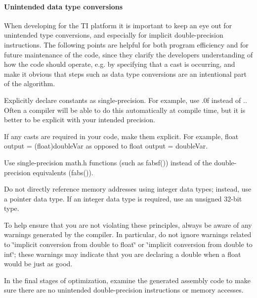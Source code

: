 \hypertarget{a00832_subsubsection__unintended_data_type_conversions_}{}\paragraph{Unintended data type conversions}\label{a00832_subsubsection__unintended_data_type_conversions_}
 When developing for the TI platform it is important to keep an eye out for unintended type conversions, and especially for implicit double-\/precision instructions. The following points are helpful for both program efficiency and for future maintenance of the code, since they clarify the developer\textquotesingle{}s understanding of how the code should operate, e.\+g. by specifying that a cast is occurring, and make it obvious that steps such as data type conversions are an intentional part of the algorithm. 
\begin{DoxyItemize}
\item Explicitly declare constants as single-\/precision. For example, use {.\+0f} instead of {.}. Often a compiler will be able to do this automatically at compile time, but it is better to be explicit with your intended precision.  
\item If any casts are required in your code, make them explicit. For example, {\ttfamily float output = (float)double\+Var} as opposed to {\ttfamily float output = double\+Var}.  
\item Use single-\/precision math.\+h functions (such as {\ttfamily fabsf()}) instead of the double-\/precision equivalents ({\ttfamily fabs()}).  
\item Do not directly reference memory addresses using integer data types; instead, use a pointer data type. If an integer data type is required, use an unsigned 32-\/bit type.  
\end{DoxyItemize}

To help ensure that you are not violating these principles, always be aware of any warnings generated by the compiler. In particular, do not ignore warnings related to \char`\"{}implicit conversion from \textquotesingle{}double\textquotesingle{} to \textquotesingle{}float\textquotesingle{}\char`\"{} or \char`\"{}implicit conversion from \textquotesingle{}double\textquotesingle{} to \textquotesingle{}int\textquotesingle{}\char`\"{}; these warnings may indicate that you are declaring a double when a float would be just as good.

In the final stages of optimization, examine the generated assembly code to make sure there are no unintended double-\/precision instructions or memory accesses.

